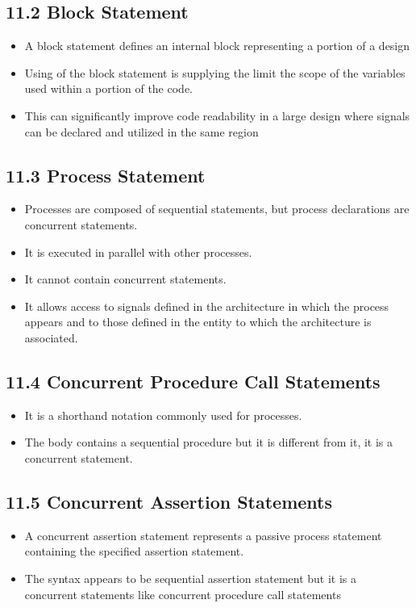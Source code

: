 \documentclass[a4paper,12pt]{article}
\begin{document}
	\subsection*{11.2 Block Statement}
	\begin{itemize}
		\item A block statement defines an internal block representing a portion of a design
		\item Using of the block statement is supplying the limit the scope of the variables used within a portion of the code.
		\item  This can significantly improve code readability in a large design where signals can be declared and utilized in the same region
	\end{itemize}
	
	\subsection*{11.3 Process Statement}
	\begin{itemize}
		\item Processes are composed of sequential statements, but process declarations are concurrent statements.
		\item It is executed in parallel with other processes.
		\item It cannot contain concurrent statements.
		\item It allows access to signals defined in the architecture in which the process appears and to those defined
		in the entity to which the architecture is associated.
	\end{itemize}
	
	\subsection*{11.4 Concurrent Procedure Call Statements}
	\begin{itemize}
		\item It is a shorthand notation commonly used for processes.
		\item The body contains a sequential procedure but it is different from it, it is a concurrent statement.
	\end{itemize}
	
	\subsection*{11.5 Concurrent Assertion Statements}
	\begin{itemize}
		\item A concurrent assertion statement represents a passive process statement containing the specified assertion
		statement.
		\item The syntax appears to be sequential assertion statement but it is a concurrent statements like concurrent procedure call statements
	\end{itemize}
	
\end{document}
